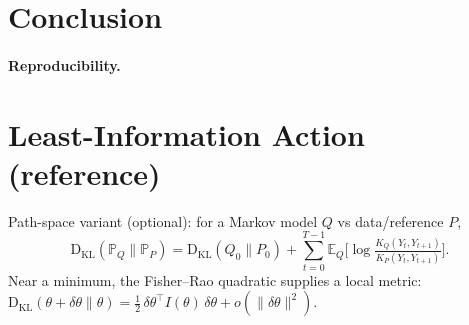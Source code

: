 \documentclass[11pt]{article}
\newcommand{\E}{\mathbb{E}}
\newcommand{\KL}{\mathrm{D}_{\mathrm{KL}}}
\newcommand{\Pbb}{\mathbb{P}}
\newcommand{\T}{\top}
\begin{document}
\section{Conclusion}

\paragraph{Reproducibility.}


\appendix

\section{Least-Information Action (reference)}
\label{app:action}
Path-space variant (optional): for a Markov model $Q$ vs data/reference $P$,
\begin{equation}
\KL(\Pbb_Q\|\Pbb_P)
=
\KL(Q_0\|P_0)
+\sum_{t=0}^{T-1}\E_Q\!\Big[\log \tfrac{K_Q(Y_t,Y_{t+1})}{K_P(Y_t,Y_{t+1})}\Big].
\end{equation}
Near a minimum, the Fisher--Rao quadratic supplies a local metric:
$\KL(\theta+\delta\theta\|\theta)=\tfrac12\,\delta\theta^\T I(\theta)\,\delta\theta+o(\|\delta\theta\|^2)$.
\end{document}
